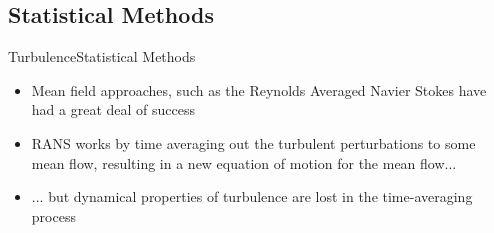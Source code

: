 \documentclass[10pt]{beamer}
\begin{document}

\subsection{Statistical Methods}
\begin{frame}{Turbulence}{Statistical Methods}
  \begin{itemize}
    \item<1-> Mean field approaches, such as the Reynolds Averaged Navier Stokes have had a great deal of success
    \item<2-> RANS works by time averaging out the turbulent perturbations to some mean flow, resulting in a new equation of motion for the mean flow...
    \item<3-> ... but dynamical properties of turbulence are lost in the time-averaging process 
  \end{itemize}
\end{frame}
\end{document}
